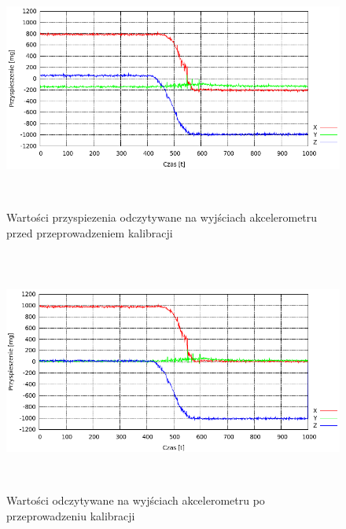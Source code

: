 \begin{figure}[h!]
 \centering
 \includegraphics[height=80mm]{../images/ch04/raw_acc_data.png}
 \caption{Wartości przyspiezenia odczytywane na wyjściach akcelerometru przed
 przeprowadzeniem kalibracji}
 \label{fig:MMADataRaw}
\end{figure}
  
\begin{figure}[h!]
 \centering
 \includegraphics[height=80mm]{../images/ch04/calib_acc_data.png}
 \caption{Wartości odczytywane na wyjściach akcelerometru po przeprowadzeniu kalibracji}
 \label{fig:MMADataCalib}
\end{figure}